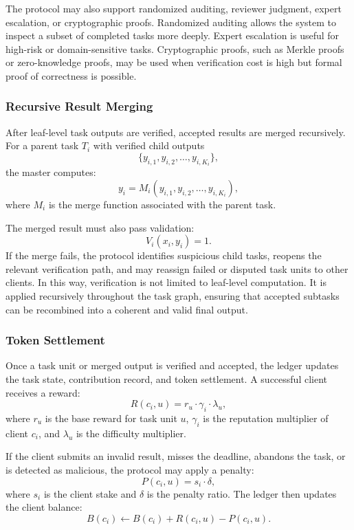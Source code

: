 \documentclass{article}
\theoremstyle{plain}
\begin{document}
The protocol may also support randomized auditing, reviewer judgment, expert escalation, or cryptographic proofs. Randomized auditing allows the system to inspect a subset of completed tasks more deeply. Expert escalation is useful for high-risk or domain-sensitive tasks. Cryptographic proofs, such as Merkle proofs or zero-knowledge proofs, may be used when verification cost is high but formal proof of correctness is possible.

\subsubsection{Recursive Result Merging}

After leaf-level task outputs are verified, accepted results are merged recursively. For a parent task $T_i$ with verified child outputs
\[
\{y_{i,1}, y_{i,2}, \ldots, y_{i,K_i}\},
\]
the master computes:
\[
y_i = M_i(y_{i,1}, y_{i,2}, \ldots, y_{i,K_i}),
\]
where $M_i$ is the merge function associated with the parent task.

The merged result must also pass validation:
\[
V_i(x_i, y_i) = 1.
\]
If the merge fails, the protocol identifies suspicious child tasks, reopens the relevant verification path, and may reassign failed or disputed task units to other clients. In this way, verification is not limited to leaf-level computation. It is applied recursively throughout the task graph, ensuring that accepted subtasks can be recombined into a coherent and valid final output.

\subsubsection{Token Settlement}

Once a task unit or merged output is verified and accepted, the ledger updates the task state, contribution record, and token settlement. A successful client receives a reward:
\[
R(c_i,u)=r_u \cdot \gamma_i \cdot \lambda_u,
\]
where $r_u$ is the base reward for task unit $u$, $\gamma_i$ is the reputation multiplier of client $c_i$, and $\lambda_u$ is the difficulty multiplier.

If the client submits an invalid result, misses the deadline, abandons the task, or is detected as malicious, the protocol may apply a penalty:
\[
P(c_i,u)=s_i \cdot \delta,
\]
where $s_i$ is the client stake and $\delta$ is the penalty ratio. The ledger then updates the client balance:
\[
B(c_i) \leftarrow B(c_i) + R(c_i,u) - P(c_i,u).
\]
\end{document}
